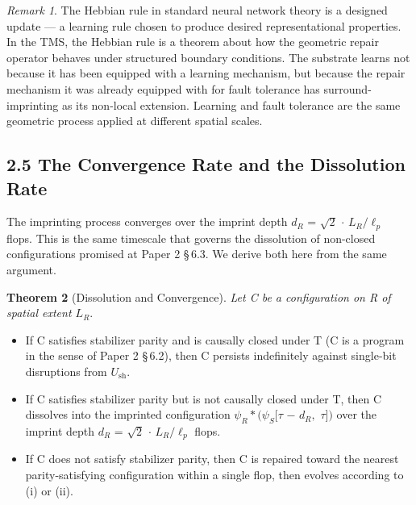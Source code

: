 \documentclass[11pt,oneside]{report}
\newtheorem{theorem}{Theorem}[section]
\theoremstyle{definition}
\theoremstyle{remark}
\newtheorem{remark}[theorem]{Remark}
\begin{document}
\begin{remark}
The Hebbian rule in standard neural network theory is a designed
update --- a learning rule chosen to produce desired representational
properties. In the TMS, the Hebbian rule is a theorem about how the
geometric repair operator behaves under structured boundary conditions.
The substrate learns not because it has been equipped with a learning
mechanism, but because the repair mechanism it was already equipped with
for fault tolerance has surround-imprinting as its non-local extension.
Learning and fault tolerance are the same geometric process applied at
different spatial scales.
\end{remark}

\subsection*{2.5 The Convergence Rate and the Dissolution Rate}

The imprinting process converges over the imprint depth \ensuremath{d_{R}} = \ensuremath{\sqrt{2}} \ensuremath{\cdot}
\ensuremath{L_{R}/\ell_{p}} flops. This is the same timescale that governs the dissolution
of non-closed configurations promised at Paper 2 \S\,6.3. We derive both
here from the same argument.

\begin{theorem}[Dissolution and Convergence]
Let C be a configuration on R of
spatial extent \ensuremath{L_{R}.}
\end{theorem}

\begin{itemize}
\item
  If C satisfies stabilizer parity and is causally closed under T (C is
  a program in the sense of Paper 2 \S\,6.2), then C persists indefinitely
  against single-bit disruptions from \ensuremath{U_{\mathrm{sh}}.}
\item
  If C satisfies stabilizer parity but is not causally closed under T,
  then C dissolves into the imprinted configuration
  \ensuremath{\psi_{R}*(\psi_{S}}\textbar\ensuremath{[\tau} \ensuremath{-} \ensuremath{d_{R},} \ensuremath{\tau ])} over the imprint depth \ensuremath{d_{R}} = \ensuremath{\sqrt{2}}
  \ensuremath{\cdot} \ensuremath{L_{R}/\ell_{p}} flops.
\item
  If C does not satisfy stabilizer parity, then C is repaired toward the
  nearest parity-satisfying configuration within a single flop, then
  evolves according to (i) or (ii).
\end{itemize}
\end{document}
